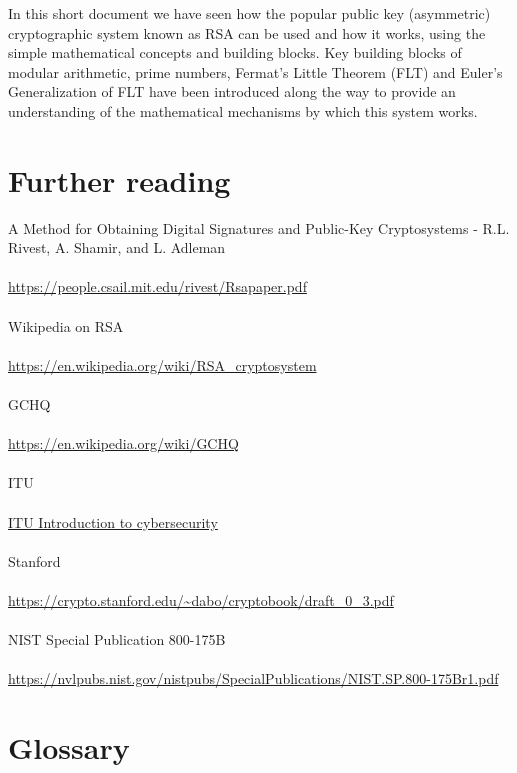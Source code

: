 \documentclass[11pt]{article}   	%
\begin{document}
In this short document we have seen how the popular public key (asymmetric) cryptographic system known as RSA can be used and how it works, using the simple mathematical concepts and building blocks. Key building blocks of modular arithmetic, prime numbers, Fermat's Little Theorem (FLT) and Euler's Generalization of FLT have been introduced along the way to provide an understanding of the mathematical mechanisms by which this system works.

\break


\section*{Further reading}

A Method for Obtaining Digital Signatures and Public-Key Cryptosystems - R.L. Rivest, A. Shamir, and L. Adleman \\
\\
\url{https://people.csail.mit.edu/rivest/Rsapaper.pdf} \\
\\
Wikipedia on RSA \\
\\
\url{https://en.wikipedia.org/wiki/RSA_cryptosystem} \\
\\
GCHQ \\
\\
\url{https://en.wikipedia.org/wiki/GCHQ} \\
\\
ITU \\
\\
\href{https://www.itu.int/en/ITU-D/Cybersecurity/Documents/01-Introduction%20to%20Cryptography.pdf}{ITU Introduction to cybersecurity} \\
\\
Stanford \\
\\
\url{https://crypto.stanford.edu/~dabo/cryptobook/draft_0_3.pdf} \\
\\
NIST Special Publication 800-175B \\
\\
\url{https://nvlpubs.nist.gov/nistpubs/SpecialPublications/NIST.SP.800-175Br1.pdf}

\break


\section*{Glossary}
\end{document}
